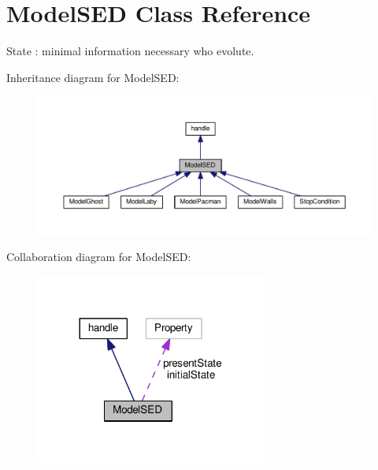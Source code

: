 \hypertarget{class_model_s_e_d}{}\section{Model\+S\+ED Class Reference}
\label{class_model_s_e_d}


State \+: minimal information necessary who evolute.  




Inheritance diagram for Model\+S\+ED\+:\nopagebreak
\begin{figure}[H]
\begin{center}
\leavevmode
\includegraphics[width=350pt]{class_model_s_e_d__inherit__graph}
\end{center}
\end{figure}


Collaboration diagram for Model\+S\+ED\+:\nopagebreak
\begin{figure}[H]
\begin{center}
\leavevmode
\includegraphics[width=216pt]{class_model_s_e_d__coll__graph}
\end{center}
\end{figure}
